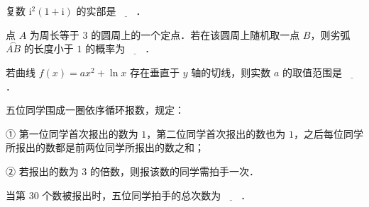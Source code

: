 \begin{question}
复数 $\mathrm i^2(1+\mathrm i)$ 的实部是$\underline{\qquad}$．

\end{question}
\begin{question}
点 $A$ 为周长等于 $3$ 的圆周上的一个定点．若在该圆周上随机取一点 $B$，则劣弧 $\overset{\frown}{AB}$ 的长度小于 $1$ 的概率为$\underline{\qquad}$．

\end{question}
\begin{question}
若曲线 $f(x)=ax^2+\ln x$ 存在垂直于 $y$ 轴的切线，则实数 $a$ 的取值范围是$\underline{\qquad}$．

\end{question}
\begin{question}
五位同学围成一圈依序循环报数，规定：

① 第一位同学首次报出的数为 $1$，第二位同学首次报出的数也为 $1$，之后每位同学所报出的数都是前两位同学所报出的数之和；

② 若报出的数为 $3$ 的倍数，则报该数的同学需拍手一次．

当第 $30$ 个数被报出时，五位同学拍手的总次数为$\underline{\qquad}$．

\end{question}

